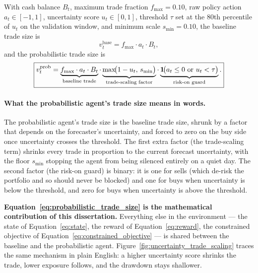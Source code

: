 With cash balance $B_t$, maximum trade fraction $f_{\max} = 0.10$, raw policy action $a_t \in [-1, 1]$, uncertainty score $u_t \in [0, 1]$, threshold $\tau$ set at the 80th percentile of $u_t$ on the validation window, and minimum scale $s_{\min} = 0.10$, the baseline trade size is
\begin{equation}
  \label{eq:baseline_trade_size}
  v_t^{\mathrm{base}} = f_{\max} \cdot a_t \cdot B_t,
\end{equation}
and the probabilistic trade size is
\begin{equation}
  \label{eq:probabilistic_trade_size}
  \boxed{
    v_t^{\mathrm{prob}} = \underbrace{f_{\max} \cdot a_t \cdot B_t}_{\text{baseline trade}} \cdot \underbrace{\max\!\bigl( 1 - u_t, \, s_{\min} \bigr)}_{\text{trade-scaling factor}} \cdot \underbrace{\mathbf{1}\!\bigl( a_t \leq 0 \text{ or } u_t < \tau \bigr)}_{\text{risk-on guard}}.
  }
\end{equation}

\paragraph{What the probabilistic agent's trade size means in words.} The probabilistic agent's trade size is the baseline trade size, shrunk by a factor that depends on the forecaster's uncertainty, and forced to zero on the buy side once uncertainty crosses the threshold. The first extra factor (the trade-scaling term) shrinks every trade in proportion to the current forecast uncertainty, with the floor $s_{\min}$ stopping the agent from being silenced entirely on a quiet day. The second factor (the risk-on guard) is binary: it is one for sells (which de-risk the portfolio and so should never be blocked) and one for buys when uncertainty is below the threshold, and zero for buys when uncertainty is above the threshold.

\textbf{Equation~\ref{eq:probabilistic_trade_size} is the mathematical contribution of this dissertation.} Everything else in the environment --- the state of Equation~\ref{eq:state}, the reward of Equation~\ref{eq:reward}, the constrained objective of Equation~\ref{eq:constrained_objective} --- is shared between the baseline and the probabilistic agent. Figure~\ref{fig:uncertainty_trade_scaling} traces the same mechanism in plain English: a higher uncertainty score shrinks the trade, lower exposure follows, and the drawdown stays shallower.



